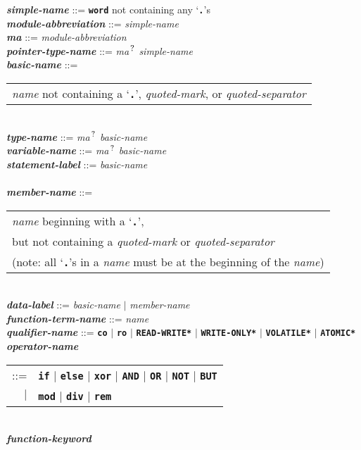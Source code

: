 \documentclass[12pt]{article}
\newcommand{\TT}[1]{{\tt \bfseries #1}}
\newcommand{\QMARK}{{$^{\,\mbox{\footnotesize ?}}$}}
\newcommand{\MA}{{\em ma}\QMARK}
\newcommand{\ttkey}[1]{{\tt \bfseries #1}}
\newcommand{\emkey}[1]{{\em \bfseries #1}}
\newcommand{\ttakey}[1]{{\tt \bfseries *#1*}}
\newenvironment{indpar}[1][0.3in]%
	{\begin{list}{}%
		     {\setlength{\itemsep}{0in}%
		      \setlength{\topsep}{0in}%
		      \setlength{\parsep}{1ex}%
		      \setlength{\labelwidth}{#1}%
		      \setlength{\leftmargin}{#1}%
		      \addtolength{\leftmargin}{\labelsep}}%
	 \item}%
	{\end{list}}
\begin{document}
\begin{indpar}
\emkey{simple-name} ::= \TT{word} not containing any `\TT{.}'s \\
\emkey{module-abbreviation} ::= {\em simple-name} \\
\emkey{ma} ::= {\em module-abbreviation} \\
\emkey{pointer-type-name}\label{POINTER-TYPE-NAME} ::=
    \MA{} {\em simple-name}
\\[1ex]
\emkey{basic-name}
	::= \begin{tabular}[t]{@{}l@{}}
	    {\em name} not containing a `\TT{.}', {\em quoted-mark}, or
	    {\em quoted-separator}
	    \end{tabular} \\
\emkey{type-name}\label{TYPE-NAME} ::=
    \MA{} {\em basic-name} \\
\emkey{variable-name}\label{VARIABLE-NAME} ::=
    \MA{} {\em basic-name} \\
\emkey{statement-label} ::= {\em basic-name}
    \label{STATEMENT-LABEL} \\
\\[1ex]
\emkey{member-name}\label{MEMBER-NAME}
	::= \begin{tabular}[t]{@{}l@{}}
                        {\em name} beginning with a `\TT{.}', \\
			but not containing a {\em quoted-mark} or
			    {\em quoted-separator} \\
			(note: all `\TT{.}'s in a {\em name} must be at
			 the beginning of the {\em name})
			\end{tabular} \\
\emkey{data-label}\label{DATA-LABEL} ::=
    {\em basic-name} $|$ {\em member-name}
\\[1ex]
\emkey{function-term-name} ::= {\em name}
    \label{FUNCTION-TERM-NAME}
\\[1ex]
\emkey{qualifier-name}\label{QUALIFIER-NAME} ::=
    \ttkey{co} $|$ \ttkey{ro} $|$ \ttakey{READ-WRITE} $|$
    \ttakey{WRITE-ONLY} $|$ \ttakey{VOLATILE} $|$ \ttakey{ATOMIC}
\\[1ex]
\emkey{operator-name}
    \begin{tabular}[t]{rl}
    ::= & \TT{if} $|$ \TT{else}
                  $|$ \TT{xor} $|$ \TT{AND} $|$ \TT{OR}
		  $|$ \TT{NOT} $|$ \TT{BUT}  \\
    $|$ & \TT{mod} $|$ \TT{div} $|$ \TT{rem}
    \end{tabular}
\\[1ex]
\emkey{function-keyword}
    \begin{tabular}[t]{rl}

\end{tabular}
\end{indpar}
\end{document}
